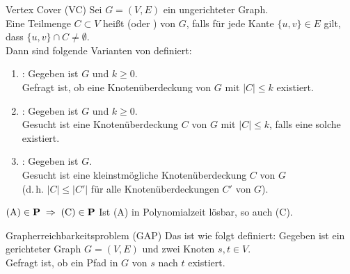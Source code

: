 \linie

\begin{Def}{Vertex Cover (VC)}
    Sei $G = (V, E)$ ein ungerichteter Graph.\\
    Eine Teilmenge $C \subset V$ heißt  (oder ) von $G$,
    falls für jede Kante $\{u, v\} \in E$ gilt, dass $\{u, v\} \cap C \not= \emptyset$.\\
    Dann sind folgende Varianten von  definiert:
    \begin{enumerate}[label=(\Alph*)]
        \item
        :
        Gegeben ist $G$ und $k \ge 0$.\\
        Gefragt ist, ob eine Knotenüberdeckung von $G$ mit $|C| \le k$ existiert.
        
        \item
        :
        Gegeben ist $G$ und $k \ge 0$.\\
        Gesucht ist eine Knotenüberdeckung $C$ von $G$ mit $|C| \le k$,
        falls eine solche existiert.
        
        \item
        :
        Gegeben ist $G$.\\
        Gesucht ist eine kleinstmögliche Knotenüberdeckung $C$ von $G$\\
        (d.\,h. $|C| \le |C'|$ für alle Knotenüberdeckungen $C'$ von $G$).
    \end{enumerate}
\end{Def}

\begin{Satz}{$\text{(A)} \in \P \;\Rightarrow\; \text{(C)} \in \P$}
    Ist (A) in Polynomialzeit lösbar, so auch (C).
\end{Satz}

\linie
\pagebreak

\begin{Def}{Grapherreichbarkeitsproblem (GAP)}
    Das  ist wie folgt definiert:
    Gegeben ist ein gerichteter Graph $G = (V, E)$ und zwei Knoten $s, t \in V$.\\
    Gefragt ist, ob ein Pfad in $G$ von $s$ nach $t$ existiert.
\end{Def}

